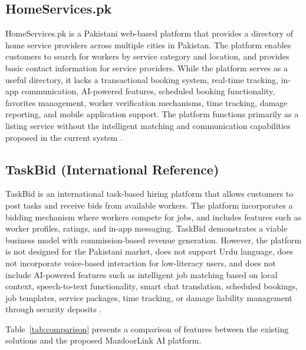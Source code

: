 \documentclass[12pt,a4paper]{report}
\begin{document}
\subsection{HomeServices.pk}
HomeServices.pk is a Pakistani web-based platform that provides a directory of
home service providers across multiple cities in Pakistan. The platform enables
customers to search for workers by service category and location, and provides
basic contact information for service providers. While the platform serves as a
useful directory, it lacks a transactional booking system, real-time tracking,
in-app communication, AI-powered features, scheduled booking functionality,
favorites management, worker verification mechanisms, time tracking, damage
reporting, and mobile application support. The platform functions primarily as a
listing service without the intelligent matching and communication capabilities
proposed in the current system \cite{homeservices}.

\subsection{TaskBid (International Reference)}
TaskBid is an international task-based hiring platform that allows customers to
post tasks and receive bids from available workers. The platform incorporates a
bidding mechanism where workers compete for jobs, and includes features such as
worker profiles, ratings, and in-app messaging. TaskBid demonstrates a viable
business model with commission-based revenue generation. However, the platform
is not designed for the Pakistani market, does not support Urdu language, does
not incorporate voice-based interaction for low-literacy users, and does not
include AI-powered features such as intelligent job matching based on local
context, speech-to-text functionality, smart chat translation, scheduled
bookings, job templates, service packages, time tracking, or damage liability
management through security deposits \cite{taskbid}.

Table~\ref{tab:comparison} presents a comparison of features between the
existing solutions and the proposed MazdoorLink AI platform.
\end{document}
